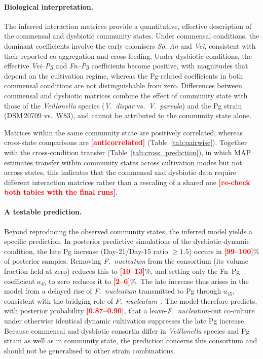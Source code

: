 \documentclass[11pt,a4paper]{article}
\newcommand{\TBD}[1]{\textcolor{red}{\textbf{[#1]}}}
\begin{document}
\paragraph{Biological interpretation.}
The inferred interaction matrices provide a quantitative, effective description of the commensal and dysbiotic community states.
Under commensal conditions, the dominant coefficients involve the early colonisers \textit{So}, \textit{An} and \textit{Vei}, consistent with their reported co-aggregation and cross-feeding. Under dysbiotic conditions, the effective \textit{Vei}--\textit{Pg} and \textit{Fn}--\textit{Pg} coefficients become positive, with magnitudes that depend on the cultivation regime, whereas the Pg-related coefficients in both commensal conditions are not distinguishable from zero.
Differences between commensal and dysbiotic matrices combine the effect of community state with those of the \textit{Veillonella} species (\textit{V.~dispar} vs.\ \textit{V.~parvula}) and the Pg strain (DSM\,20709 vs.\ W83), and cannot be attributed to the community state alone.

Matrices within the same community state are positively correlated, whereas cross-state comparisons are \TBD{anticorrelated} (Table~\ref{tab:pairwise}).
Together with the cross-condition transfer (Table~\ref{tab:cross_prediction}), in which MAP estimates transfer within community states across cultivation modes but not across states, this indicates that the commensal and dysbiotic data require different interaction matrices rather than a rescaling of a shared one \TBD{re-check both tables with the final runs}.

\paragraph{A testable prediction.}
Beyond reproducing the observed community states, the inferred model yields a specific prediction.
In posterior predictive simulations of the dysbiotic dynamic condition, the late Pg increase (Day-21/Day-15 ratio $\ge1.5$) occurs in \TBD{99--100}\% of posterior samples.
Removing \textit{F.~nucleatum} from the consortium (its volume fraction held at zero) reduces this to \TBD{10--13}\%, and setting only the Fn--Pg coefficient $a_{45}$ to zero reduces it to \TBD{2--6}\%.
The late increase thus arises in the model from a delayed rise of \textit{F.~nucleatum} transmitted to Pg through $a_{45}$, consistent with the bridging role of \textit{F.~nucleatum}~\cite{Kolenbrander2010OralMultispecies}.
The model therefore predicts, with posterior probability \TBD{0.87--0.90}, that a leave-\textit{F.~nucleatum}-out co-culture under otherwise identical dynamic cultivation suppresses the late Pg increase.
Because commensal and dysbiotic consortia differ in \textit{Veillonella} species and Pg strain as well as in community state, the prediction concerns this consortium and should not be generalised to other strain combinations.
\end{document}
